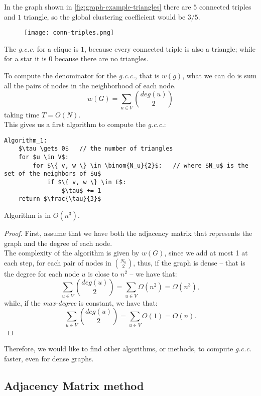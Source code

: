 In the graph shown in \cref{fig:graph-example-triangles} there are $5$ connected triples and $1$ triangle, so the global clustering coefficient would be $3/5$.
%
\begin{figure}
	\centering
	\texttt{[image: conn-triples.png]}
\end{figure}

\obs The \emph{g.c.c.} for a clique is $1$, because every connected triple is also a triangle; while for a star it is $0$ because there are no triangles.

To compute the denominator for the \emph{g.c.c.}, that is $w(g)$, what we can do is sum all the pairs of nodes in the neighborhood of each node.
\[
	w(G) = \sum_{u \in V}\binom{deg(u)}{2}
\]
taking time $T = O(N)$.\\
This gives us a first algorithm to compute the \emph{g.c.c.}:
%
\begin{lstlisting}[caption={Algorithm 1}, label={lst:triangles-alg1}]
Algorithm_1:
    $\tau \gets 0$   // the number of triangles
    for $u \in V$:
        for $\{ v, w \} \in \binom{N_u}{2}$:   // where $N_u$ is the set of the neighbors of $u$
            if $\{ v, w \} \in E$:
                $\tau$ += 1
    return $\frac{\tau}{3}$
\end{lstlisting}
%
\begin{claim}\label{cl:triangles-1}
	Algorithm is in $O(n^3)$.
\end{claim}
\begin{proof}
    First, assume that we have both the adjacency matrix that represents the graph and the degree of each node.\\
    The complexity of the algorithm is given by $w(G)$, since we add at most 1 at each step, for each pair of nodes in $\binom{N_u}{2}$, thus,
	if the graph is dense -- that is the degree for each node $u$ is close to $n^2$ -- we have that:
	\[
		\sum_{u \in V}\binom{deg(u)}{2} = \sum_{u \in V}\Omega(n^2) = \Omega(n^3),
	\]
	while, if the \textit{max-degree} is constant, we have that:
	\[
		\sum_{u \in V}\binom{deg(u)}{2} = \sum_{u \in V} O(1) = O(n).
	\]
\end{proof}

Therefore, we would like to find other algorithms, or methods, to compute \textit{g.c.c.} faster, even for dense graphs.


\subsection{Adjacency Matrix method}\label{sec:triangles-adjacency}

